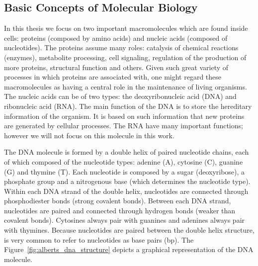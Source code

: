 \subsection{Basic Concepts of Molecular Biology}
\label{sec:basic.concepts.molecular.biology}

In this thesis we focus on two important macromolecules which are found inside cells: proteins (composed by amino acids) and nucleic acids (composed of nucleotides). The proteins assume many roles: catalysis of chemical reactions (enzymes), metabolite processing, cell signaling, regulation of the production of more proteins, structural function and others. Given such great variety of processes in which proteins are associated with, one might regard these macromolecules as having a central role in the maintenance of living organisms. The nucleic acids can be of two types: the deoxyribonucleic acid (DNA) and ribonucleic acid (RNA). The main function of the DNA is to store the hereditary information of the organism. It is based on such information that new proteins are generated by cellular processes. The RNA have many important functions; however we will not focus on this molecule in this work.

The DNA molecule is formed by a double helix of paired nucleotide chains, each of which composed of the nucleotide types: adenine (A), cytosine (C), guanine (G) and thymine (T). Each nucleotide is composed by a sugar (deoxyribose), a phosphate group and a nitrogenous base (which determines the nucleotide type). Within each DNA strand of the double helix, nucleotides are connected through phosphodiester bonds (strong covalent bonds). Between each DNA strand, nucleotides are paired and connected through hydrogen bonds (weaker than covalent bonds). Cytosines always pair with guanines and adenines always pair with thymines. Because nucleotides are paired between the double helix structure, is very common to refer to nucleotides as base pairs (bp). The Figure~\ref{fig:alberts_dna_structure} depicts a graphical representation of the DNA molecule.

